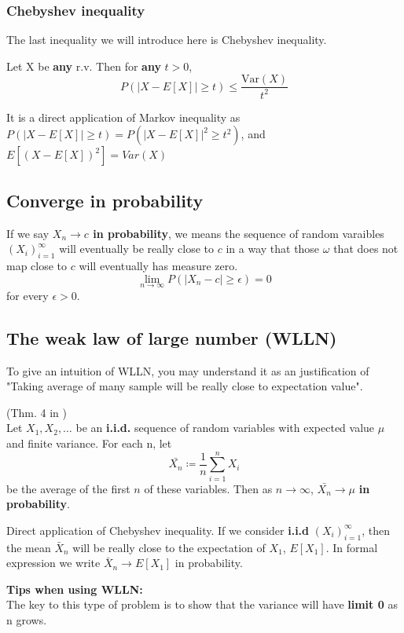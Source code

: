 \subsubsection*{Chebyshev inequality}
The last inequality we will introduce here is Chebyshev inequality.
\begin{note}
   Let X be \textbf{any} r.v. Then for \textbf{any} \(t > 0\),
   \[
    P(|X - E[X]| \geq t) \leq \frac{\text{Var} (X)}{t^2}
   \]  
\end{note}
It is a direct application of Markov inequality as \( P(|X - E[X]| \geq t) = P(|X - E[X]|^2 \geq t^2) \), and \(E[(X - E[X])^2] = Var(X)\) 
 

\subsection{Converge in probability}
If we say \textbf{ \(X_n \to c\) in probability}, we means the sequence of random varaibles \((X_i)_{i=1}^\infty\) will eventually be really close to \(c\) in a way that
those \(\omega \) that does not map close to \(c\) will eventually has measure zero. 
\[
    \lim\limits_{n \to \infty} P(|X_n -c| \geq \epsilon  ) = 0
\]    
for every \(\epsilon >0\). 
\subsection{The weak law of large number (WLLN)}
To give an intuition of WLLN, you may understand it as an justification of "Taking average of many sample will be really close to expectation value". 
\begin{theorem} 
    (Thm. 4 in \cite{Und_Chatterjee})\\
    Let \(X_1,X_2, \dots\) be an \textbf{i.i.d.} sequence of random variables with expected value \(\mu \) and finite variance. For each n, let 
    \[
        \bar{X_n} \coloneqq \frac{1}{n} \sum_{i=1}^{n} X_{i} 
    \]   
    be the average of the first \(n\) of these variables. Then as \(n \to \infty \), \(\bar{X_n} \to  \mu \) \textbf{in probability}.    
\end{theorem}
Direct application of Chebyshev inequality. If we consider \textbf{i.i.d} \((X_i)_{i=1}^{\infty} \), then the mean \(\bar{X}_n\) will be really close to the expectation of \(X_1\), \(E[X_1]\). 
In formal expression we write \(\bar{X}_n \to E[X_1]\) in probability. 



\textbf{Tips when using WLLN:}\\
The key to this type of problem is to show that the variance will have \textbf{limit 0} as n grows.  